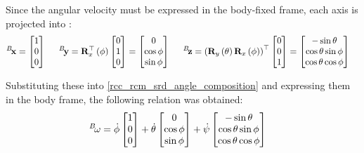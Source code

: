Since the angular velocity must be expressed in the body-fixed frame, each axis is projected into
:
\begin{align}
	\fvect{x}{B} & = \begin{bmatrix}1 \\ 0 \\ 0\end{bmatrix} \hspace{.5cm}
	\fvect{y}{B} = \lrmatr{R}{\top}{x}\left(\phi\right)\begin{bmatrix}0 \\ 1 \\ 0 \end{bmatrix} =
	\begin{bmatrix}0 \\ \cos{\phi} \\ \sin{\phi} \end{bmatrix} \hspace{.5cm}
	\fvect{z}{B} = {\left(\lrdmatr{R}{y}\left(\theta\right)\lrdmatr{R}{x}\left(\phi\right)\right)}^{\top}
	\begin{bmatrix} 0 \\ 0 \\ 1 \end{bmatrix} =
	\begin{bmatrix}-\sin{\theta} \\ \cos{\theta}\sin{\phi} \\ \cos{\theta}\cos{\phi} \end{bmatrix}
\end{align}

Substituting these into \cref{rcc_rcm_srd_angle_composition} and expressing them in the body frame,
the following relation was obtained:
\begin{align}
	\fvect{\omega}{B} & =
	\dot{\phi}\begin{bmatrix} 1 \\ 0 \\ 0 \end{bmatrix}
	+ \dot{\theta}\begin{bmatrix} 0 \\ \cos{\scal{\phi}} \\ \sin{\scal{\phi}} \end{bmatrix}
	+ \dot{\psi}\begin{bmatrix} -\sin{\scal{\theta}} \\ \cos{\scal{\theta}}\sin{\scal{\phi}} \\ \cos{\scal{\theta}}\cos{\scal{\phi}} \end{bmatrix}
\end{align}

